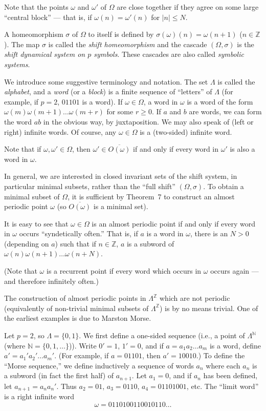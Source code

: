 Note that the points $\omega$ and $\omega'$ of $\Omega$ are close together if they agree on some large “central block” — that is, if $\omega(n) = \omega'(n)$ for $|n| \le N$.


A homeomorphism $\sigma$ of $\Omega$ to itself is defined by $\sigma(\omega)(n) = \omega(n+1)$ ($n \in \mathbb{Z}$). The map $\sigma$ is called the \textit{shift homeomorphism} and the cascade $(\Omega, \sigma)$ is the \textit{shift dynamical system on $p$ symbols}. These cascades are also called \textit{symbolic systems}.

We introduce some suggestive terminology and notation. The set $\Lambda$ is called the \textit{alphabet}, and a \textit{word} (or a \textit{block}) is a finite sequence of “letters” of $\Lambda$ (for example, if $p = 2$, $01101$ is a word). If $\omega \in \Omega$, a word in $\omega$ is a word of the form $\omega(m)\omega(m+1)\ldots\omega(m+r)$ for some $r \ge 0$. If $a$ and $b$ are words, we can form the word $ab$ in the obvious way, by juxtaposition. We may also speak of (left or right) infinite words. Of course, any $\omega \in \Omega$ is a (two-sided) infinite word.

Note that if $\omega, \omega' \in \Omega$, then $\omega' \in \overline{O(\omega)}$ if and only if every word in $\omega'$ is also a word in $\omega$.

In general, we are interested in closed invariant sets of the shift system, in particular minimal subsets, rather than the “full shift” $(\Omega, \sigma)$. To obtain a minimal subset of $\Omega$, it is sufficient by Theorem~7 to construct an almost periodic point $\omega$ (so $\overline{O(\omega)}$ is a minimal set).

It is easy to see that $\omega \in \Omega$ is an almost periodic point if and only if every word in $\omega$ occurs “syndetically often.” That is, if $a$ is a word in $\omega$, there is an $N > 0$ (depending on $a$) such that if $n \in \mathbb{Z}$, $a$ is a subword of $\omega(n)\omega(n+1)\ldots\omega(n+N)$.

(Note that $\omega$ is a recurrent point if every word which occurs in $\omega$ occurs again — and therefore infinitely often.)


The construction of almost periodic points in $\Lambda^{\mathbb{Z}}$ which are not periodic (equivalently of non-trivial minimal subsets of $\Lambda^{\mathbb{Z}}$) is by no means trivial. One of the earliest examples is due to Marston Morse.

Let $p = 2$, so $\Lambda = \{0,1\}$. We first define a one-sided sequence (i.e., a point of $\Lambda^{\mathbb{N}}$ (where $\mathbb{N} = \{0,1,\ldots\}$)). Write $0' = 1$, $1' = 0$, and if $a = a_1 a_2 \ldots a_m$ is a word, define $a' = a_1' a_2' \ldots a_m'$. (For example, if $a = 01101$, then $a' = 10010$.) To define the “Morse sequence,” we define inductively a sequence of words $a_n$ where each $a_n$ is a subword (in fact the first half) of $a_{n+1}$. Let $a_1 = 0$, and if $a_n$ has been defined, let $a_{n+1} = a_n a_n'$. Thus $a_2 = 01$, $a_3 = 0110$, $a_4 = 01101001$, etc. The “limit word” is a right infinite word
\[
    \omega = 0110100110010110\ldots
\]


